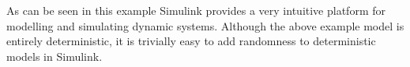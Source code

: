 

As can be seen in this example Simulink provides a very intuitive platform for modelling and simulating dynamic systems. Although the above example model is entirely deterministic, it is trivially easy to add randomness to deterministic models in Simulink.


